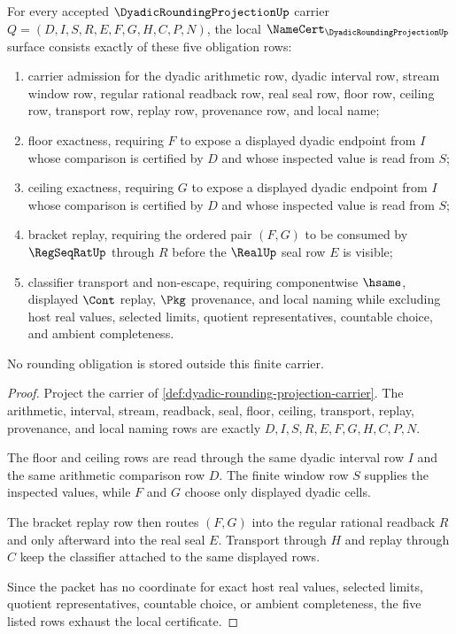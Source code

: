 \begin{theorem}
\label{thm:dyadic-rounding-projection-namecert-obligations}
For every accepted $\DyadicRoundingProjectionUp$ carrier $Q=(D,I,S,R,E,F,G,H,C,P,N)$, the local $\NameCert_{\DyadicRoundingProjectionUp}$ surface consists exactly of these five obligation rows:
\begin{enumerate}
\item carrier admission for the dyadic arithmetic row, dyadic interval row, stream window row, regular rational readback row, real seal row, floor row, ceiling row, transport row, replay row, provenance row, and local name;
\item floor exactness, requiring $F$ to expose a displayed dyadic endpoint from $I$ whose comparison is certified by $D$ and whose inspected value is read from $S$;
\item ceiling exactness, requiring $G$ to expose a displayed dyadic endpoint from $I$ whose comparison is certified by $D$ and whose inspected value is read from $S$;
\item bracket replay, requiring the ordered pair $(F,G)$ to be consumed by $\RegSeqRatUp$ through $R$ before the $\RealUp$ seal row $E$ is visible;
\item classifier transport and non-escape, requiring componentwise $\hsame$, displayed $\Cont$ replay, $\Pkg$ provenance, and local naming while excluding host real values, selected limits, quotient representatives, countable choice, and ambient completeness.
\end{enumerate}
No rounding obligation is stored outside this finite carrier.
\end{theorem}
\begin{proof}
Project the carrier of \autoref{def:dyadic-rounding-projection-carrier}. The arithmetic, interval, stream, readback, seal, floor, ceiling, transport, replay, provenance, and local naming rows are exactly $D,I,S,R,E,F,G,H,C,P,N$.

The floor and ceiling rows are read through the same dyadic interval row $I$ and the same arithmetic comparison row $D$. The finite window row $S$ supplies the inspected values, while $F$ and $G$ choose only displayed dyadic cells.

The bracket replay row then routes $(F,G)$ into the regular rational readback $R$ and only afterward into the real seal $E$. Transport through $H$ and replay through $C$ keep the classifier attached to the same displayed rows.

Since the packet has no coordinate for exact host real values, selected limits, quotient representatives, countable choice, or ambient completeness, the five listed rows exhaust the local certificate.
\end{proof}

